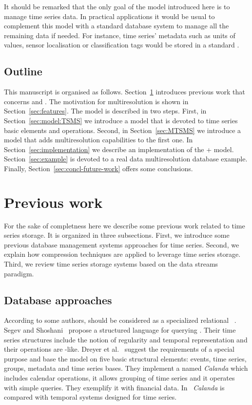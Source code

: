 It should be remarked that the only goal of the model introduced here
is to manage time series data. In practical applications it would be
usual to complement this model with a standard database system to
manage all the remaining data if needed. For instance, time series'
metadata such as units of values, sensor localisation or
classification tags would be stored in a standard .


\subsection{Outline}

This manuscript is organised as
follows. Section~\ref{sec:related-work} introduces previous work that
concerns  and .  The motivation for
multiresolution is shown in Section~\ref{sec:features}.  The model is
described in two steps.
%
First, in Section~\ref{sec:model:TSMS} we introduce a 
model that is devoted to time series basic elements and operations.
%
Second, in Section~\ref{sec:MTSMS} we introduce a  model
that adds multiresolution capabilities to the first one.
%
In Section~\ref{sec:implementation} we describe an implementation of
the + model.  Section~\ref{sec:example} is
devoted to a real data multiresolution database example.  Finally,
Section~\ref{sec:concl-future-work} offers some conclusions.




\section{Previous work}
\label{sec:related-work}

For the sake of completness here we describe some previous work
related to time series storage. It is organized in three subsections.
First, we introduce some previous database management systems
approaches for time series. Second, we explain how compression
techniques are applied to leverage time series storage. Third, we
review time series storage systems based on the data streams paradigm.


\subsection{Database approaches}

According to some authors,  should be considered as a
specialized relational ~\cite{last01}.  Segev and
Shoshani~\cite{segev87:sigmod} propose a structured language for
querying . Their time series structures include the notion
of regularity and temporal representation and their operations are
-like.  Dreyer et al.~\cite{dreyer94} suggest the
requirements of a special purpose  and base the model on
five basic structural elements: events, time series, groups, metadata
and time series bases. They implement a  named
\emph{Calanda} which includes calendar operations, it allows grouping
of time series and it operates with simple queries. They exemplify it
with financial data. In~\cite{schmidt95} \emph{Calanda} is compared
with temporal systems designed for time series.
 
